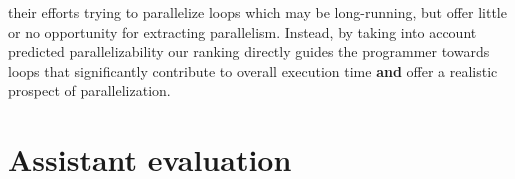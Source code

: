 their efforts trying to parallelize loops which may be long-running, but offer little or no opportunity for extracting parallelism. Instead, by taking into account predicted parallelizability our ranking directly guides the programmer towards loops that significantly contribute to overall execution time \textbf{and} offer a realistic prospect of parallelization.
\section{Assistant evaluation}
\label{evaluation}
